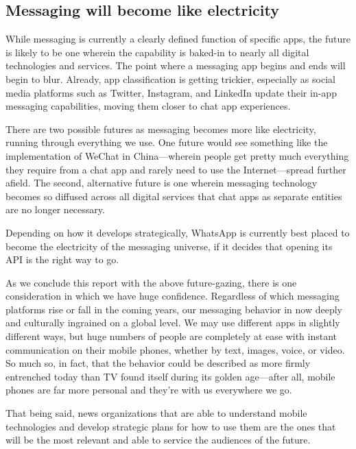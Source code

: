 \documentclass[notoc, symmetric, nobib, nols]{towcenter-guideto-book}
\begin{document}
\subsection{Messaging will become like electricity}
While messaging is currently a clearly defined function of specific apps, the future is likely to be one wherein the capability is baked-in to nearly all digital technologies and services. The point where a messaging app begins and ends will begin to blur. Already, app classification is getting trickier, especially as social media platforms such as Twitter, Instagram, and LinkedIn update their in-app messaging capabilities, moving them closer to chat app experiences. 

There are two possible futures as messaging becomes more like electricity, running through everything we use. One future would see something like the implementation of WeChat in China---wherein people get pretty much everything they require from a chat app and rarely need to use the Internet---spread further afield. The second, alternative future is one wherein messaging technology becomes so diffused across all digital services that chat apps as separate entities are no longer necessary. 

Depending on how it develops strategically, WhatsApp is currently best placed to become the electricity of the messaging universe, if it decides that opening its API is the right way to go.  

As we conclude this report with the above future-gazing, there is one consideration in which we have huge confidence. Regardless of which messaging platforms rise or fall in the coming years, our messaging behavior in now deeply and culturally ingrained on a global level. We may use different apps in slightly different ways, but huge numbers of people are completely at ease with instant communication on their mobile phones, whether by text, images, voice, or video. So much so, in fact, that the behavior could be described as more firmly entrenched today than TV found itself during its golden age---after all, mobile phones are far more personal and they're with us everywhere we go.

That being said, news organizations that are able to understand mobile technologies and develop strategic plans for how to use them are the ones that will be the most relevant and able to service the audiences of the future.
\end{document}
